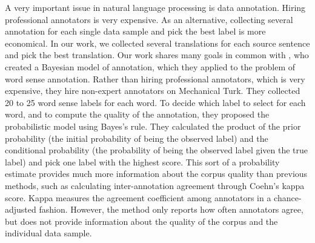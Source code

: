 \documentclass[11pt]{article}
\begin{document}


A very important issue in natural language processing is data annotation. Hiring professional annotators is very expensive. As an alternative, collecting several annotation for each single data sample and pick the best label is  more economical.  In our work, we collected several translations for each source sentence and pick the best translation. Our work shares many goals in common with , who created a Bayesian model of annotation, which they applied to the problem of word sense annotation. Rather than hiring professional annotators, which is very expensive, they hire non-expert annotators on Mechanical Turk.  They collected 20 to 25 word sense labels for each word. To decide which label to select for each word, and to compute the quality of the annotation, they proposed the probabilistic model using Bayes's rule. They calculated the product of the prior probability (the initial probability of being the observed label) and the conditional probability (the probability of being the observed label given the true label) and pick one label with the highest score. This sort of a probability estimate provides much more information about the corpus quality than previous methods, such as calculating inter-annotation agreement through Coehn's kappa score.  Kappa measures the agreement coefficient among annotators in a chance-adjusted fashion.  However, the method  only  reports how often annotators agree, but does not provide information about the quality of the corpus and the individual data sample.
\end{document}
